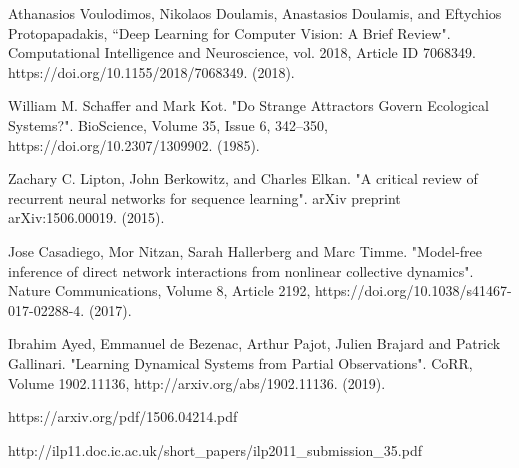 \documentclass[letterpaper, 10 pt, conference]{ieeeconf}  %
\begin{document}
\begin{thebibliography}{99}
 Athanasios Voulodimos, Nikolaos Doulamis, Anastasios Doulamis, and Eftychios Protopapadakis, “Deep Learning for Computer Vision: A Brief Review". Computational Intelligence and Neuroscience, vol. 2018, Article ID 7068349. https://doi.org/10.1155/2018/7068349. (2018).

 William M. Schaffer and Mark Kot. "Do Strange Attractors Govern Ecological Systems?". BioScience, Volume 35, Issue 6, 342–350, https://doi.org/10.2307/1309902. (1985).

 Zachary C. Lipton, John Berkowitz, and Charles Elkan. "A critical review of recurrent neural networks for sequence learning". arXiv preprint arXiv:1506.00019. (2015).

 Jose Casadiego, Mor Nitzan, Sarah Hallerberg and Marc Timme. "Model-free inference of direct network interactions from nonlinear collective dynamics". Nature Communications, Volume 8, Article 2192, https://doi.org/10.1038/s41467-017-02288-4. (2017).

 Ibrahim Ayed, Emmanuel de Bezenac, Arthur Pajot, Julien Brajard and Patrick Gallinari. "Learning Dynamical Systems from Partial Observations". CoRR, Volume 1902.11136, http://arxiv.org/abs/1902.11136. (2019). 

 https://arxiv.org/pdf/1506.04214.pdf

 http://ilp11.doc.ic.ac.uk/short\_papers/ilp2011\_submission\_35.pdf

\end{thebibliography}
\end{document}
